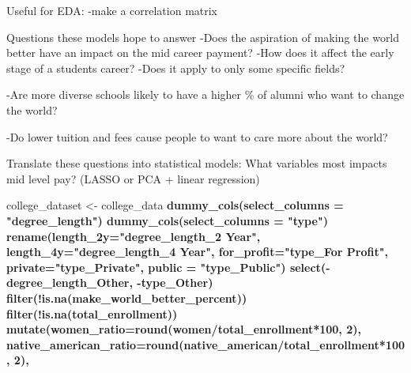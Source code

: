 \documentclass[
]{article}
\newenvironment{Shaded}{\begin{snugshade}}{\end{snugshade}}
\newcommand{\DataTypeTok}[1]{\textcolor[rgb]{0.13,0.29,0.53}{#1}}
\newcommand{\DecValTok}[1]{\textcolor[rgb]{0.00,0.00,0.81}{#1}}
\newcommand{\KeywordTok}[1]{\textcolor[rgb]{0.13,0.29,0.53}{\textbf{#1}}}
\newcommand{\NormalTok}[1]{#1}
\newcommand{\OperatorTok}[1]{\textcolor[rgb]{0.81,0.36,0.00}{\textbf{#1}}}
\newcommand{\StringTok}[1]{\textcolor[rgb]{0.31,0.60,0.02}{#1}}
\begin{document}
Useful for EDA: -make a correlation matrix

Questions these models hope to answer -Does the aspiration of making the
world better have an impact on the mid career payment? -How does it
affect the early stage of a students career? -Does it apply to only some
specific fields?

-Are more diverse schools likely to have a higher \% of alumni who want
to change the world?

-Do lower tuition and fees cause people to want to care more about the
world?

Translate these questions into statistical models: What variables most
impacts mid level pay? (LASSO or PCA + linear regression)

\begin{Shaded}
\begin{Highlighting}[]
\NormalTok{college_dataset <-}\StringTok{  }\NormalTok{college_data }\OperatorTok{%>%}\StringTok{ }
\StringTok{  }\KeywordTok{dummy_cols}\NormalTok{(}\DataTypeTok{select_columns =} \StringTok{"degree_length"}\NormalTok{) }\OperatorTok{%>%}\StringTok{ }
\StringTok{  }\KeywordTok{dummy_cols}\NormalTok{(}\DataTypeTok{select_columns =} \StringTok{"type"}\NormalTok{) }\OperatorTok{%>%}\StringTok{ }
\StringTok{  }\KeywordTok{rename}\NormalTok{(}\DataTypeTok{length_2y=}\StringTok{"degree_length_2 Year"}\NormalTok{, }
         \DataTypeTok{length_4y=}\StringTok{"degree_length_4 Year"}\NormalTok{, }
         \DataTypeTok{for_profit=}\StringTok{"type_For Profit"}\NormalTok{, }
         \DataTypeTok{private=}\StringTok{"type_Private"}\NormalTok{, }
         \DataTypeTok{public =} \StringTok{"type_Public"}\NormalTok{) }\OperatorTok{%>%}\StringTok{ }
\StringTok{  }\KeywordTok{select}\NormalTok{(}\OperatorTok{-}\NormalTok{degree_length_Other, }\OperatorTok{-}\NormalTok{type_Other) }\OperatorTok{%>%}\StringTok{  }
\StringTok{  }\KeywordTok{filter}\NormalTok{(}\OperatorTok{!}\KeywordTok{is.na}\NormalTok{(make_world_better_percent)) }\OperatorTok{%>%}\StringTok{ }
\StringTok{  }\KeywordTok{filter}\NormalTok{(}\OperatorTok{!}\KeywordTok{is.na}\NormalTok{(total_enrollment)) }\OperatorTok{%>%}\StringTok{ }
\StringTok{  }\KeywordTok{mutate}\NormalTok{(}\DataTypeTok{women_ratio=}\KeywordTok{round}\NormalTok{(women}\OperatorTok{/}\NormalTok{total_enrollment}\OperatorTok{*}\DecValTok{100}\NormalTok{, }\DecValTok{2}\NormalTok{),}
         \DataTypeTok{native_american_ratio=}\KeywordTok{round}\NormalTok{(native_american}\OperatorTok{/}\NormalTok{total_enrollment}\OperatorTok{*}\DecValTok{100}\NormalTok{, }\DecValTok{2}\NormalTok{),}
}}}}}}}
\end{Highlighting}
\end{Shaded}
\end{document}
